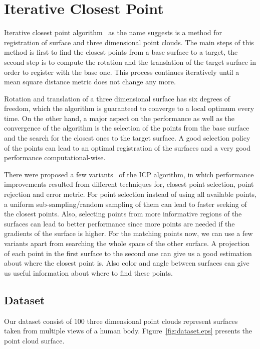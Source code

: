 \section{Iterative Closest Point}
\label{icp}

Iterative closest point algorithm~\cite{icpOr} as the name suggests is a method for registration of surface and three dimensional point clouds. The main steps of this method is first to find the closest points from a base surface to a target, the second step is to compute the rotation and the translation of the target surface in order to register with the base one. This process continues iteratively until a mean square distance metric does not change any more.

Rotation and translation of a three dimensional surface has six degrees of freedom, which the algorithm is guaranteed to converge to a local optimum every time. On the other hand, a major aspect on the performance as well as the convergence of the algorithm is the selection of the points from the base surface and the search for the closest ones to the target surface. A good selection policy of the points can lead to an optimal registration of the surfaces and a very good performance computational-wise.

There were proposed a few variants~\cite{icpVar} of the ICP algorithm, in which performance improvements resulted from different techniques for, closest point selection, point rejection and error metric. For point selection instead of using all available points, a uniform sub-sampling/random sampling of them can lead to faster seeking of the closest points. Also, selecting points from more informative regions of the surfaces can lead to better performance since more points are needed if the gradients of the surface is higher. For the matching points now, we can use a few variants apart from searching the whole space of the other surface. A projection of each point in the first surface to the second one can give us a good estimation about where the closest point is. Also color and angle between surfaces can give us useful information about where to find these points.

\subsection{Dataset}
Our dataset consist of $100$ three dimensional point clouds represent surfaces taken from multiple views of a human body. Figure~\ref{fig:dataset.eps} presents the point cloud surface.

